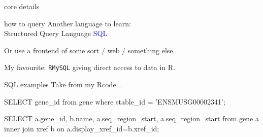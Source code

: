 \documentclass[pdf]{beamer}
\begin{document}
\begin{frame}{core details}
\begin{figure}[ht]
  \end{figure}
\end{frame}

\begin{frame}{how to query}
  Another language to learn:\\
  Structured Query Language \textcolor{blue}{SQL}

  \pause
  Or use a frontend of some sort / web / something else.

  \pause
  My favourite: \texttt{RMySQL} giving direct access to data in R.
\end{frame}

\begin{frame}[fragile]{SQL examples}
  Take from my Rcode... 
  \begin{sqlcode}
 SELECT gene_id from gene where stable_id = 'ENSMUSG00002341';

 SELECT a.gene_id, b.name, a.seq_region_start, a.seq_region_start
  from gene a
  inner join xref b on a.display_xref_id=b.xref_id;
  \end{sqlcode}
\end{frame}
\end{document}
